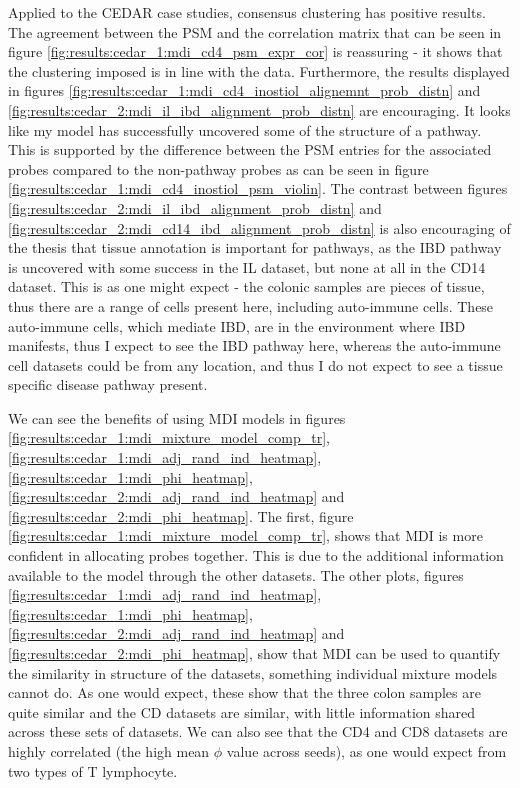 \documentclass[12pt]{article} %
\begin{document}
	Applied to the CEDAR case studies, consensus clustering has positive results. The agreement between the PSM and the correlation matrix that can be seen in figure \ref{fig:results:cedar_1:mdi_cd4_psm_expr_cor} is reassuring - it shows that the clustering imposed is in line with the data. Furthermore, the results displayed in figures \ref{fig:results:cedar_1:mdi_cd4_inostiol_alignemnt_prob_distn} and \ref{fig:results:cedar_2:mdi_il_ibd_alignment_prob_distn} are encouraging. It looks like my model has successfully uncovered some of the structure of a pathway. This is supported by the difference between the PSM entries for the associated probes compared to the non-pathway probes as can be seen in figure \ref{fig:results:cedar_1:mdi_cd4_inostiol_psm_violin}. The contrast between figures \ref{fig:results:cedar_2:mdi_il_ibd_alignment_prob_distn} and \ref{fig:results:cedar_2:mdi_cd14_ibd_alignment_prob_distn} is also encouraging of the thesis that tissue annotation is important for pathways, as the IBD pathway is uncovered with some success in the IL dataset, but none at all in the CD14 dataset. This is as one might expect - the colonic samples are pieces of tissue, thus there are a range of cells present here, including auto-immune cells. These auto-immune cells, which mediate IBD, are in the environment where IBD manifests, thus I expect to see the IBD pathway here, whereas the auto-immune cell datasets could be from any location, and thus I do not expect to see a tissue specific disease pathway present.
	
	We can see the benefits of using MDI models in figures \ref{fig:results:cedar_1:mdi_mixture_model_comp_tr}, \ref{fig:results:cedar_1:mdi_adj_rand_ind_heatmap}, \ref{fig:results:cedar_1:mdi_phi_heatmap}, \ref{fig:results:cedar_2:mdi_adj_rand_ind_heatmap} and \ref{fig:results:cedar_2:mdi_phi_heatmap}. The first, figure \ref{fig:results:cedar_1:mdi_mixture_model_comp_tr}, shows that MDI is more confident in allocating probes together. This is due to the additional information available to the model through the other datasets. The other plots, figures \ref{fig:results:cedar_1:mdi_adj_rand_ind_heatmap}, \ref{fig:results:cedar_1:mdi_phi_heatmap}, \ref{fig:results:cedar_2:mdi_adj_rand_ind_heatmap} and \ref{fig:results:cedar_2:mdi_phi_heatmap}, show that MDI can be used to quantify the similarity in structure of the datasets, something individual mixture models cannot do. As one would expect, these show that the three colon samples are quite similar and the CD datasets are similar, with little information shared across these sets of datasets. We can also see that the CD4 and CD8 datasets are highly correlated (the high mean $\phi$ value across seeds), as one would expect from two types of T lymphocyte.
	
\end{document}
